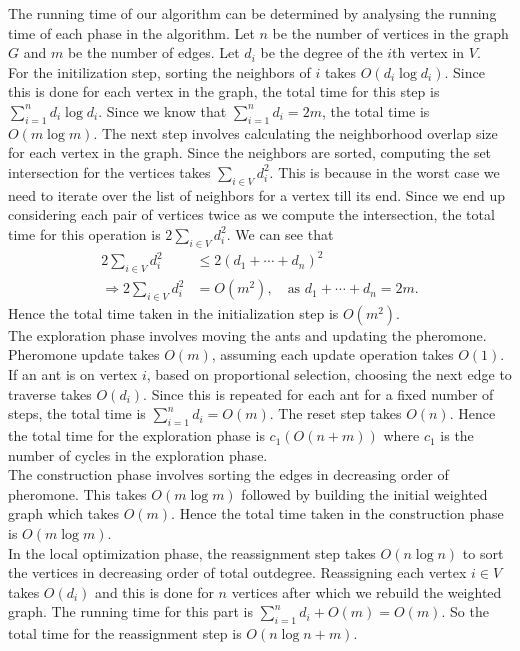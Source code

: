 \begin{spacing}{1.5}
The running time of our algorithm can be determined by analysing the running time of each phase in the algorithm. Let $n$ be the number of vertices in the graph $G$ and $m$ be the number of edges. Let $d_i$ be the degree of the $i$th vertex in $V$.\\ 
\indent For the initilization step, sorting the neighbors of $i$ takes $O(d_i\log d_i)$. Since this is done for each vertex in the graph, the total time for this step is $\displaystyle\sum_{i=1}^n d_i\log d_i$. Since we know that $\displaystyle\sum_{i=1}^n d_i = 2m$, the total time is $O(m\log m)$. The next step involves calculating the neighborhood overlap size for each vertex in the graph. Since the neighbors are sorted, computing the set intersection for the vertices takes $\displaystyle\sum_{i\in V} d_i^2$. This is because in the worst case we need to iterate over the list of neighbors for a vertex till its end. Since we end up considering each pair of vertices twice as we compute the intersection, the total time for this operation is $2\displaystyle\sum_{i\in V} d_i^2$. We can see that
\begin{align}
 2\displaystyle\sum_{i\in V} d_i^2 &\leq 2(d_1+\cdots+d_n)^2\\
 \Rightarrow 2\displaystyle\sum_{i\in V} d_i^2 &= O(m^2), \quad \text{as } d_1+\cdots+d_n = 2m.
\end{align}
Hence the total time taken in the initialization step is $O(m^2)$.\\
\indent The exploration phase involves moving the ants and updating the pheromone. Pheromone update takes $O(m)$, assuming each update operation takes $O(1)$.  If an ant is on vertex $i$, based on proportional selection, choosing the next edge to traverse takes $O(d_i)$. Since this is repeated for each ant for a fixed number of steps, the total time is $\displaystyle\sum_{i=1}^nd_i = O(m)$. The reset step takes $O(n)$. Hence the total time for the exploration phase is $c_1(O(n+m))$ where $c_1$ is the number of cycles in the exploration phase.\\
\indent The construction phase involves sorting the edges in decreasing order of pheromone. This takes $O(m\log m)$ followed by building the initial weighted graph which takes $O(m)$. Hence the total time taken in the construction phase is $O(m\log m)$.\\
\indent In the local optimization phase, the reassignment step takes $O(n\log n)$ to sort the vertices in decreasing order of total outdegree. Reassigning each vertex $i\in V$ takes $O(d_i)$ and this is done for $n$ vertices after which we rebuild the weighted graph. The running time for this part is $\displaystyle\sum_{i=1}^nd_i + O(m) = O(m)$. So the total time for the reassignment step is $O(n\log n+m)$.\\

\end{spacing}
